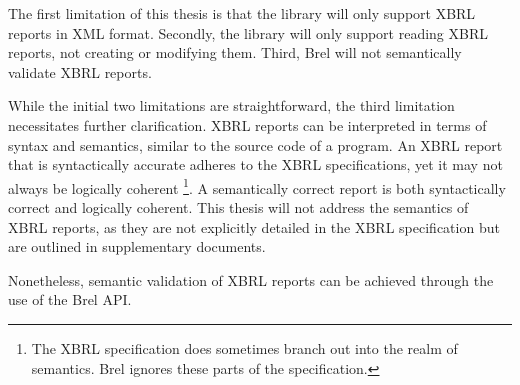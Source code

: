 The first limitation of this thesis is that the library will only support XBRL reports in XML format.
Secondly, the library will only support reading XBRL reports, not creating or modifying them.
Third, Brel will not semantically validate XBRL reports.

While the initial two limitations are straightforward, the third limitation necessitates further clarification.
XBRL reports can be interpreted in terms of syntax and semantics, similar to the source code of a program.
An XBRL report that is syntactically accurate adheres to the XBRL specifications, yet it may not always be logically coherent
\footnote{The XBRL specification does sometimes branch out into the realm of semantics. Brel ignores these parts of the specification.}.
A semantically correct report is both syntactically correct and logically coherent.
This thesis will not address the semantics of XBRL reports, 
as they are not explicitly detailed in the XBRL specification but are outlined in supplementary documents.

Nonetheless, semantic validation of XBRL reports can be achieved through the use of the Brel API.

